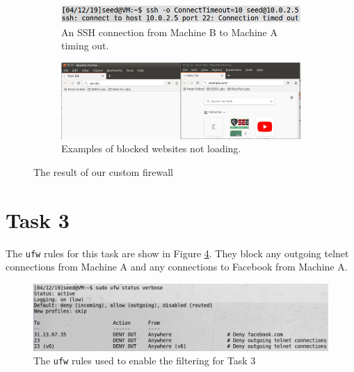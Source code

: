 \documentclass[12pt,letterpaper]{article}
\begin{document}
		\begin{figure}[p]
			\begin{subfigure}{\linewidth}
				\centering
				\includegraphics[width=4in]{task-2-ssh-timeout}
				\caption{An SSH connection from Machine B to Machine A timing out.}
				\label{fig:task-2-ssh-timeout}
			\end{subfigure}
		
			\vspace{.25in}
			
			\begin{subfigure}{\linewidth}
				\centering
				\includegraphics[width=\linewidth]{task-2-websites-blocked}
				\caption{Examples of blocked websites not loading.}
				\label{fig:task-2-websites-blocked}
			\end{subfigure}
		
			\caption{The result of our custom firewall}
			\label{fig:task-2-results}
		\end{figure}
	
	\pagebreak
		
	\section*{Task 3}
		The \texttt{ufw} rules for this task are show in Figure \ref{fig:task-3-ufw-rules}. They block any outgoing telnet connections from Machine A and any connections to Facebook from Machine A.
		
		\begin{figure}
			\begin{center}
				\includegraphics[width=\linewidth]{task-3-ufw-rules}
			\end{center}
			\caption{The \texttt{ufw} rules used to enable the filtering for Task 3}
			\label{fig:task-3-ufw-rules}
		\end{figure}
	
\end{document}
